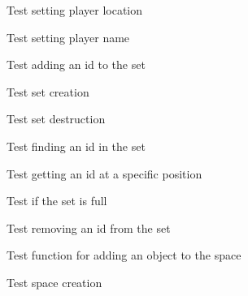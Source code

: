 \begin{DoxyRefList}
%
Test setting player location  
\item[Global \doxylink{player__test_8c_a9d87c09e6af910d695265e3fd77ae3a2}{test1\+\_\+player\+\_\+set\+\_\+name} ()]\label{test__test000141}%
%
Test setting player name  
\item[Global \doxylink{set__test_8c_a014ebe1b46af5ea318143fc61894d9c0}{test1\+\_\+set\+\_\+add} ()]\label{test__test000170}%
%
Test adding an id to the set  
\item[Global \doxylink{set__test_8c_a6f654ab4b44e8a9b9cedfb78c378a5d7}{test1\+\_\+set\+\_\+create} ()]\label{test__test000166}%
%
Test set creation  
\item[Global \doxylink{set__test_8c_abbf27b57efa5c91184003ec07d1f5708}{test1\+\_\+set\+\_\+destroy} ()]\label{test__test000168}%
%
Test set destruction  
\item[Global \doxylink{set__test_8c_a63cde9ac2062aa348653f626ef6290b8}{test1\+\_\+set\+\_\+find} ()]\label{test__test000178}%
%
Test finding an id in the set  
\item[Global \doxylink{set__test_8c_a4c852b23db6d63a9a8f0902bb91601c3}{test1\+\_\+set\+\_\+get\+\_\+id\+\_\+at\+\_\+pos} ()]\label{test__test000175}%
%
Test getting an id at a specific position  
\item[Global \doxylink{set__test_8c_a7bae6941906dd98c8d8ffb2da8a409f6}{test1\+\_\+set\+\_\+is\+\_\+full} ()]\label{test__test000181}%
%
Test if the set is full  
\item[Global \doxylink{set__test_8c_aef76d78c2dceb2578f57f4d008f75c89}{test1\+\_\+set\+\_\+remove} ()]\label{test__test000173}%
%
Test removing an id from the set  
\item[Global \doxylink{space__test_8c_afe51f379fb29f8e96f9f034df991de30}{test1\+\_\+space\+\_\+add\+\_\+object} ()]\label{test__test000202}%
%
Test function for adding an object to the space  
\item[Global \doxylink{space__test_8c_a69278cc022dc5688d4725f8d36317b30}{test1\+\_\+space\+\_\+create} ()]\label{test__test000184}%
%
Test space creation  
\item[Global \doxylink{space__test_8c_adedfa811f705fbb20ba20987a24c3ac5}{test1\+\_\+space\+\_\+find\+\_\+object} ()]\label{test__test000206}%

\end{DoxyRefList}
